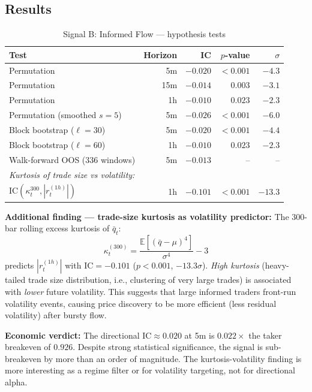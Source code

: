 \documentclass[12pt, a4paper]{article}
\theoremstyle{definition}
\newcommand{\IC}{\mathrm{IC}}
\newcommand{\E}{\mathbb{E}}
\begin{document}
\subsection{Results}

\begin{table}[H]
\centering
\caption{Signal B: Informed Flow — hypothesis tests}
\begin{tabular}{lrrrr}
\toprule
Test & Horizon & IC & $p$-value & $\sigma$ \\
\midrule
Permutation & 5m  & $-0.020$ & $<0.001$ & $-4.3$ \\
Permutation & 15m & $-0.014$ & $0.003$  & $-3.1$ \\
Permutation & 1h  & $-0.010$ & $0.023$  & $-2.3$ \\
Permutation (smoothed $s=5$) & 5m & $-0.026$ & $<0.001$ & $-6.0$ \\
Block bootstrap ($\ell=30$) & 5m & $-0.020$ & $<0.001$ & $-4.4$ \\
Block bootstrap ($\ell=60$) & 1h & $-0.010$ & $0.023$  & $-2.3$ \\
Walk-forward OOS (336 windows) & 5m & $-0.013$ & -- & -- \\
\midrule
\multicolumn{5}{l}{\textit{Kurtosis of trade size vs volatility:}}\\
$\IC(\kappa_t^{300}, |r_t^{(1h)}|)$ & 1h & $-0.101$ & $<0.001$ & $-13.3$ \\
\bottomrule
\end{tabular}
\end{table}

\textbf{Additional finding — trade-size kurtosis as volatility predictor:}
The 300-bar rolling excess kurtosis of $\bar{q}_t$:
\[
  \kappa_t^{(300)} = \frac{\E[(\bar{q} - \mu)^4]}{\sigma^4} - 3
\]
predicts $|r_t^{(1h)}|$ with $\IC = -0.101$ ($p < 0.001$, $-13.3\sigma$).
\emph{High kurtosis} (heavy-tailed trade size distribution, i.e., clustering
of very large trades) is associated with \emph{lower} future volatility.
This suggests that large informed traders front-run volatility events,
causing price discovery to be more efficient (less residual volatility)
after bursty flow.

\textbf{Economic verdict:} The directional $\IC \approx 0.020$ at 5m is
$0.022\times$ the taker breakeven of $0.926$. Despite strong statistical
significance, the signal is sub-breakeven by more than an order of magnitude.
The kurtosis-volatility finding is more interesting as a regime filter or
for volatility targeting, not for directional alpha.
\end{document}
